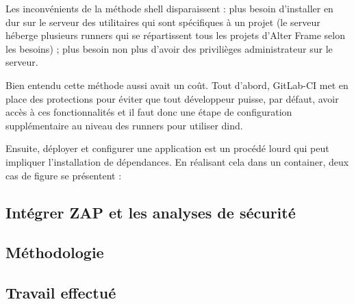 Les inconvénients de la méthode shell disparaissent : plus besoin d'installer en dur sur le serveur des utilitaires qui sont spécifiques à un projet (le serveur héberge plusieurs runners qui se répartissent tous les projets d'Alter Frame selon les besoins) ; plus besoin non plus d'avoir des privilièges administrateur sur le serveur.

Bien entendu cette méthode aussi avait un coût. Tout d'abord, GitLab-CI met en place des protections pour éviter que tout développeur puisse, par défaut, avoir accès à ces fonctionnalités et il faut donc une étape de configuration supplémentaire au niveau des runners pour utiliser dind.

Ensuite, déployer et configurer une application est un procédé lourd qui peut impliquer l'installation de dépendances. En réalisant cela dans un container, deux cas de figure se présentent :
\begin{itemize}[label=$\bullet$]
\end{itemize}

\subsection{Intégrer ZAP et les analyses de sécurité}

\subsection{Méthodologie}
\subsection{Travail effectué}
